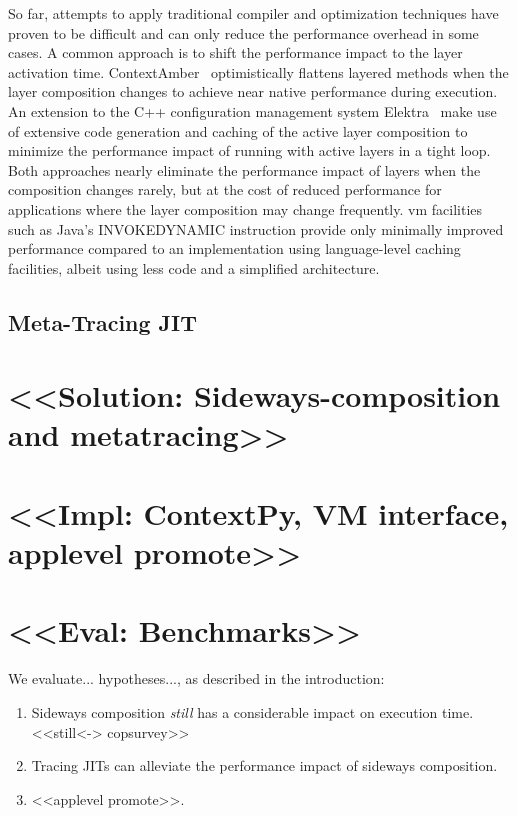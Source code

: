 \documentclass[preprint,english,10pt,nonatbib]{sigplanconf}
\begin{document}
So far, attempts to apply traditional compiler and optimization techniques have
proven to be difficult and can only reduce the performance overhead in some
cases. A common approach is to shift the performance impact to the layer
activation time. ContextAmber~\cite{springer2015efficient} optimistically
flattens layered methods when the layer composition changes to achieve near
native performance during execution. An extension to the C++ configuration
management system Elektra~\cite{Raab:2014:PEE:2637066.2637074} make use of
extensive code generation and caching of the active layer composition to
minimize the performance impact of running with active layers in a tight
loop. Both approaches nearly eliminate the performance impact of layers when the
composition changes rarely, but at the cost of reduced performance for
applications where the layer composition may change frequently. \ac{vm}
facilities such as Java's INVOKEDYNAMIC instruction provide only minimally
improved performance compared to an implementation using language-level caching
facilities, albeit using less code and a simplified architecture.

\subsection{Meta-Tracing JIT}
\label{sec:meta-tracing-jit}

\section{<<Solution: Sideways-composition and metatracing>>}
\section{<<Impl: ContextPy, VM interface, applevel promote>>}
\section{<<Eval: Benchmarks>>}


\def\idBox#1#2{%
\setlength{\fboxsep}{1pt}%
\colorbox[HTML]{#1}{\textcolor[gray]{0.9}{\rule[0.1pt]{0pt}{5pt}#2}}%
\xspace}



We evaluate... hypotheses..., as described in the introduction:
\begin{enumerate}
\item Sideways composition \emph{still} has a considerable impact on execution
  time. <<still<-> copsurvey>>
\item Tracing JITs can alleviate the performance impact of sideways composition.
\item <<applevel promote>>.
\end{enumerate}
\end{document}
